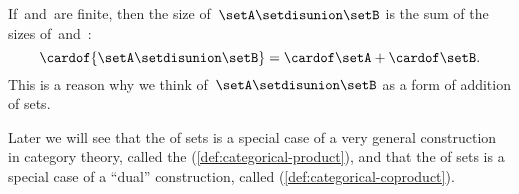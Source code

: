 \begin{remark}
    If~\setA and~\setB are finite, then the size of~$\setA \setdisunion \setB$ is the sum of the sizes of~\setA and~\setB:
    \begin{equation}
        \cardof{ \setA \setdisunion \setB} = \cardof \setA  + \cardof \setB.
    \end{equation}
    This is a reason why we think of~$\setA \setdisunion \setB$ as a form of addition of sets.
\end{remark}

\begin{remark}
    Later we will see that the  of sets is a special case of a very general construction in category theory, called the  (\cref{def:categorical-product}), and that the  of sets is a special case of a ``dual'' construction, called  (\cref{def:categorical-coproduct}).
\end{remark}

